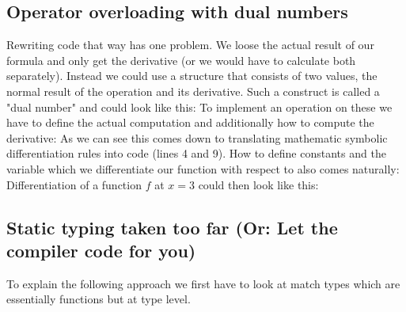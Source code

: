 \subsection{Operator overloading with dual numbers}
Rewriting code that way has one problem. We loose the actual result of our formula and only get the derivative (or we would have to calculate both separately). Instead we could use a structure that consists of two values, the normal result of the operation and its derivative. Such a construct is called a "dual number"  and could look like this:
To implement an operation on these we have to define the actual computation and additionally how to compute the derivative:
As we can see this comes down to translating mathematic symbolic differentiation rules into code (lines 4 and 9). How to define constants and the variable which we differentiate our function with respect to  also comes naturally:
Differentiation of a function $f$ at $x = 3$ could then look like this:


\subsection{Static typing taken too far (Or: Let the compiler code for you)}
To explain the following approach we first have to look at match types \cite{matchTypesScala3}which are essentially functions but at type level.
